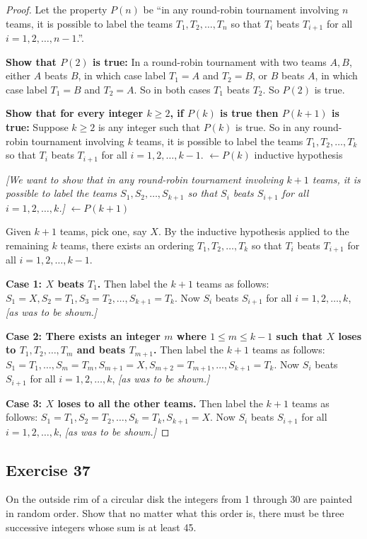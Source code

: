 \documentclass[14pt]{extarticle}
\newcommand{\from}{\leftarrow}
\newcommand{\cy}{\color{cyan}}
\begin{document}
\begin{proof}
    Let the property $P(n)$ be ``in any round-robin tournament involving $n$ teams, it is possible to label the teams $T_1, T_2, \ldots, T_n$ so that $T_i$ beats $T_{i + 1}$ for all $i = 1, 2, \ldots, n - 1$.''.

    {\bf Show that $P(2)$ is true:} In a round-robin tournament with two teams $A, B$, either $A$ beats $B$, in which case label $T_1 = A$ and $T_2 = B$, or $B$ beats $A$, in which case label $T_1 = B$ and $T_2 = A$. So in both cases $T_1$ beats $T_2$. So $P(2)$ is true.

        {\bf Show that for every integer $k \geq 2$, if $P(k)$ is true then $P(k+1)$ is true:} Suppose $k \geq 2$ is any integer such that $P(k)$ is true. So in any round-robin tournament involving $k$ teams, it is possible to label the teams $T_1, T_2, \ldots, T_k$ so that $T_i$ beats $T_{i + 1}$ for all $i = 1, 2, \ldots, k - 1$. {\cy $\from P(k)$ inductive hypothesis}

        {\it [We want to show that in any round-robin tournament involving $k+1$ teams, it is possible to label the teams $S_1, S_2, \ldots, S_{k+1}$ so that $S_i$ beats $S_{i + 1}$ for all $i = 1, 2, \ldots, k$.]} {\cy $\from P(k+1)$}

    Given $k+1$ teams, pick one, say $X$. By the inductive hypothesis applied to the remaining $k$ teams, there exists an ordering $T_1, T_2, \ldots, T_k$ so that $T_i$ beats $T_{i + 1}$ for all $i = 1, 2, \ldots, k - 1$.

        {\bf Case 1: $X$ beats $T_1$.} Then label the $k+1$ teams as follows: $S_1 = X, S_2 = T_1, S_3 = T_2, \ldots, S_{k+1} = T_k$. Now $S_i$ beats $S_{i + 1}$ for all $i = 1, 2, \ldots, k$, {\it [as was to be shown.]}

        {\bf Case 2: There exists an integer $m$ where $1 \leq m \leq k - 1$ such that $X$ loses to $T_1, T_2, \ldots, T_m$ and beats $T_{m + 1}$.} Then label the $k+1$ teams as follows: $S_1 = T_1, \ldots, S_m = T_m, S_{m+1} = X, S_{m+2} = T_{m+1}, \ldots, S_{k+1} = T_k$. Now $S_i$ beats $S_{i + 1}$ for all $i = 1, 2, \ldots, k$, {\it [as was to be shown.]}

        {\bf Case 3: $X$ loses to all the other teams.} Then label the $k+1$ teams as follows: $S_1 = T_1, S_2 = T_2, \ldots, S_k = T_k, S_{k+1} = X$. Now $S_i$ beats $S_{i + 1}$ for all $i = 1, 2, \ldots, k$, {\it [as was to be shown.]}
\end{proof}

\subsection{Exercise 37}
On the outside rim of a circular disk the integers from 1 through 30 are painted in random order. Show that no matter what this order is, there must be three successive integers whose sum is at least 45.
\end{document}
